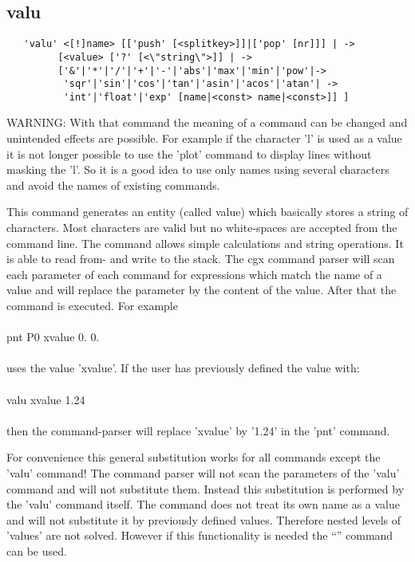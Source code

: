 \documentclass{article}
\begin{document}
\subsection{\label{valu}valu}
\begin{verbatim}
   'valu' <[!]name> [['push' [<splitkey>]]|['pop' [nr]]] | ->
         [<value> ['?' [<\"string\">]] | ->
         ['&'|'*'|'/'|'+'|'-'|'abs'|'max'|'min'|'pow'|->
          'sqr'|'sin'|'cos'|'tan'|'asin'|'acos'|'atan'| ->
          'int'|'float'|'exp' [name|<const> name|<const>]] ]
\end{verbatim}
WARNING: With that command the meaning of a command can be changed and unintended effects are possible. For example if the character 'l' is used as a value it is not longer possible to use the 'plot' command to display lines without masking the 'l'. So it is a good idea to use only names using several characters and avoid the names of existing commands.

This command generates an entity (called value) which basically stores a string of characters. Most characters are valid but no white-spaces are accepted from the command line. The command allows simple calculations and string operations. It is able to read from- and write to the stack.
The cgx command parser will scan each parameter of each command for expressions which match the name of a value and will replace the parameter by the content of the value. After that the command is executed. For example\\\\pnt P0 xvalue 0. 0.\\\\uses the value 'xvalue'. If the user has previously defined the value with:\\\\valu xvalue 1.24\\\\then the command-parser will replace 'xvalue' by '1.24' in the 'pnt' command.

For convenience this general substitution works for all commands except the 'valu' command! The command parser will not scan the parameters of the 'valu' command and will not substitute them. Instead this substitution is performed by the 'valu' command itself. The command does not treat its own name as a value and will not substitute it by previously defined values. Therefore nested levels of 'values' are not solved. However if this functionality is needed the ``'' command can be used.\\\\
\end{document}
